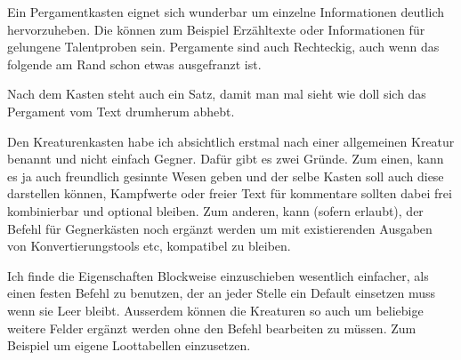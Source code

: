 \documentclass{Ilaris}
\begin{document}

Ein Pergamentkasten eignet sich wunderbar um einzelne Informationen deutlich hervorzuheben. Die können zum Beispiel Erzähltexte oder Informationen für gelungene Talentproben sein. Pergamente sind auch Rechteckig, auch wenn das folgende am Rand schon etwas ausgefranzt ist.


Nach dem Kasten steht auch ein Satz, damit man mal sieht wie doll sich das Pergament vom Text drumherum abhebt.
\spaltenumbruch

Den Kreaturenkasten habe ich absichtlich erstmal nach einer allgemeinen Kreatur benannt und nicht einfach Gegner. Dafür gibt es zwei Gründe. Zum einen, kann es ja auch freundlich gesinnte Wesen geben und der selbe Kasten soll auch diese darstellen können, Kampfwerte oder freier Text für kommentare sollten dabei frei kombinierbar und optional bleiben. Zum anderen, kann (sofern erlaubt), der Befehl für Gegnerkästen noch ergänzt werden um mit existierenden Ausgaben von Konvertierungstools etc, kompatibel zu bleiben.



Ich finde die Eigenschaften Blockweise einzuschieben wesentlich einfacher, als einen festen Befehl zu benutzen, der an jeder Stelle ein Default einsetzen muss wenn sie Leer bleibt. Ausserdem können die Kreaturen so auch um beliebige weitere Felder ergänzt werden ohne den Befehl bearbeiten zu müssen. Zum Beispiel um eigene Loottabellen einzusetzen.\\
\spaltenende
\end{document}
